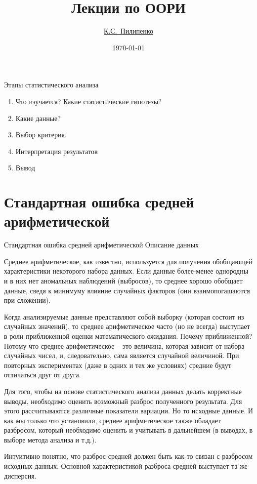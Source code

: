 \documentclass[14pt,a4paper]{article}
\title{Лекции по ООРИ}
\author{\href{mailto:www-kirill.pilipenko@yandex.ru}{К.С.~Пилипенко}} %
\date{\selectlanguage{russian}\today}
\begin{document}
\maketitle
Этапы статистического анализа
\begin{enumerate}
    \item Что изучается? Какие статистические гипотезы?
    \item Какие данные?
    \item Выбор критерия.
    \item Интерпретация результатов
    \item Вывод
\end{enumerate}

\section{Стандартная ошибка средней арифметической}
Стандартная ошибка средней арифметической
Описание данных

Среднее арифметическое, как известно, используется для получения обобщающей характеристики некоторого набора данных. Если данные более-менее однородны и в них нет аномальных наблюдений (выбросов), то среднее хорошо обобщает данные, сведя к минимуму влияние случайных факторов (они взаимопогашаются при сложении).

Когда анализируемые данные представляют собой выборку (которая состоит из случайных значений), то среднее арифметическое часто (но не всегда) выступает в роли приближенной оценки математического ожидания. Почему приближенной? Потому что среднее арифметическое – это величина, которая зависит от набора случайных чисел, и, следовательно, сама является случайной величиной. При повторных экспериментах (даже в одних и тех же условиях) средние будут отличаться друг от друга.

Для того, чтобы на основе статистического анализа данных делать корректные выводы, необходимо оценить возможный разброс полученного результата. Для этого рассчитываются различные показатели вариации. Но то исходные данные. И как мы только что установили, среднее арифметическое также обладает разбросом, который необходимо оценить и учитывать в дальнейшем (в выводах, в выборе метода анализа и т.д.).

Интуитивно понятно, что разброс средней должен быть как-то связан с разбросом исходных данных. Основной характеристикой разброса средней выступает та же дисперсия.
\end{document}
